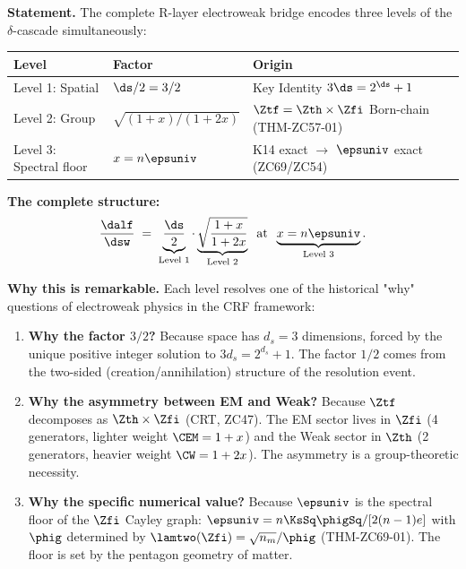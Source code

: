 \documentclass[12pt, a4paper]{article}
\begin{document}
\begin{giftbox}[title={FIND-ZC70-01: Three-Level Electroweak
  Structure Identity (Gift)}]

\textbf{Statement.}
The complete R-layer electroweak bridge encodes three
levels of the $\delta$-cascade simultaneously:

\medskip
\begin{center}
\renewcommand{\arraystretch}{1.50}
\begin{tabular}{@{}p{3.2cm}p{4.5cm}p{4.5cm}@{}}
\toprule
\textbf{Level} & \textbf{Factor} & \textbf{Origin} \\
\midrule
Level 1: Spatial & $\ds/2 = 3/2$ &
  Key Identity $3\ds = 2^{\ds}+1$\\
Level 2: Group & $\sqrt{(1+x)/(1+2x)}$ &
  $\Ztf = \Zth\times\Zfi$ Born-chain (THM-ZC57-01) \\
Level 3: Spectral floor & $x = n\epsuniv$ &
  K14 exact $\to$ $\epsuniv$ exact (ZC69/ZC54) \\
\bottomrule
\end{tabular}
\end{center}

\medskip
\textbf{The complete structure:}
\[
  \frac{\dalf}{\dsw}
  \;=\;
  \underbrace{\frac{\ds}{2}}_{\text{Level 1}}
  \cdot
  \underbrace{\sqrt{\frac{1+x}{1+2x}}}_{\text{Level 2}}
  \;\;\text{at}\;\;
  \underbrace{x = n\epsuniv}_{\text{Level 3}}.
\]

\textbf{Why this is remarkable.}
Each level resolves one of the historical "why" questions
of electroweak physics in the CRF framework:

\begin{enumerate}[leftmargin=2em]
  \item \textbf{Why the factor $3/2$?}
    Because space has $d_s = 3$ dimensions, forced by
    the unique positive integer solution to
    $3d_s = 2^{d_s}+1$. The factor $1/2$ comes from
    the two-sided (creation/annihilation) structure
    of the resolution event.

  \item \textbf{Why the asymmetry between EM and Weak?}
    Because $\Ztf$ decomposes as $\Zth\times\Zfi$
    (CRT, ZC47). The EM sector lives in $\Zfi$ (4 generators,
    lighter weight $\CEM = 1+x$) and the Weak sector in
    $\Zth$ (2 generators, heavier weight $\CW = 1+2x$).
    The asymmetry is a group-theoretic necessity.

  \item \textbf{Why the specific numerical value?}
    Because $\epsuniv$ is the spectral floor of the
    $\Zfi$ Cayley graph: $\epsuniv = n\KsSq\phigSq/[2(n-1)e]$
    with $\phig$ determined by $\lamtwo(\Zfi) = \sqrt{n_m}/\phig$
    (THM-ZC69-01). The floor is set by the pentagon geometry
    of matter.
\end{enumerate}


\end{giftbox}
\end{document}
